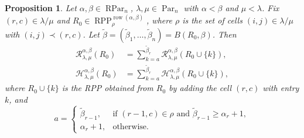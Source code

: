 \documentclass[12pt]{amsart}
\numberwithin{equation}{section}
\newtheorem{prop}[thm]{Proposition}
\theoremstyle{definition}
\newcommand\wb{\widetilde{\beta}}
\newcommand\row{\operatorname{row}}
\newcommand\Par{\operatorname{Par}}
\newcommand\RPar{\operatorname{RPar}}
\newcommand\RPP{\operatorname{RPP}}
\newcommand\lm{{\lambda/\mu}}
\newcommand\R{\mathcal{R}}
\newcommand\HH{\mathcal{H}}
\begin{document}
\begin{prop}\label{prop:H rec RPP R0}
  Let $\alpha,\beta\in\RPar_n$, $\lambda,\mu\in\Par_n$ with $\alpha<\beta$ and
  $\mu<\lambda$. Fix $(r,c)\in\lm$ and $R_0\in
  \RPP^{\row(\alpha,\beta)}_{\rho}$, where $\rho$ is the set of cells
  $(i,j)\in\lm$ with $(i,j)\prec(r,c)$. Let
  $\wb=(\wb_1,\dots,\wb_n)=B(R_0,\beta)$. Then
  \begin{align}
    \label{eq:rec M2}
    \R^{\alpha,\beta}_{\lambda,\mu}(R_0)
    &= \sum_{k=a}^{\wb_r} \R^{\alpha,\beta}_{\lambda,\mu}(R_0\cup\{k\}),\\
    \label{eq:rec H}
    \HH^{\alpha,\beta}_{\lambda,\mu}(R_0)
    &= \sum_{k=a}^{\wb_r} \HH^{\alpha,\beta}_{\lambda,\mu}(R_0\cup\{k\}),
  \end{align}
  where $R_0\cup\{k\}$ is the RPP obtained from $R_0$ by adding the cell $(r,c)$
  with entry $k$, and
  \[
a = \begin{cases}
  \wb_{r-1}, &\mbox{if $(r-1,c)\in\rho$ and $\wb_{r-1}\ge \alpha_r+1$},\\
 \alpha_r+1, &\mbox{otherwise}.
\end{cases}
\]
\end{prop}
\end{document}
